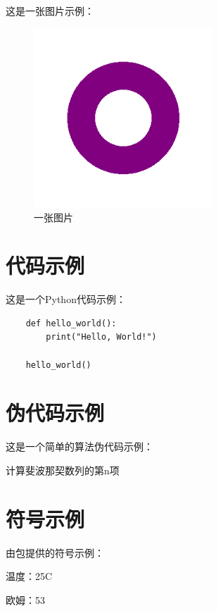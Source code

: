 \documentclass{ranarticle}
\begin{document}
这是一张图片示例：

\begin{figure}[htbp]
    \centering
    \includegraphics[width=0.6\textwidth]{assets/example.png}
    \caption{一张图片}
\end{figure}

\section{代码示例}

这是一个Python代码示例：

\begin{verbatim}
    def hello_world():
        print("Hello, World!")

    hello_world()
\end{verbatim}

\section{伪代码示例}

这是一个简单的算法伪代码示例：

\begin{algorithm}[H]
    \caption{计算斐波那契数列的第n项}
\end{algorithm}

\section{符号示例}

由包提供的符号示例：

温度：25\degree C

欧姆：53 \ohm
\end{document}
